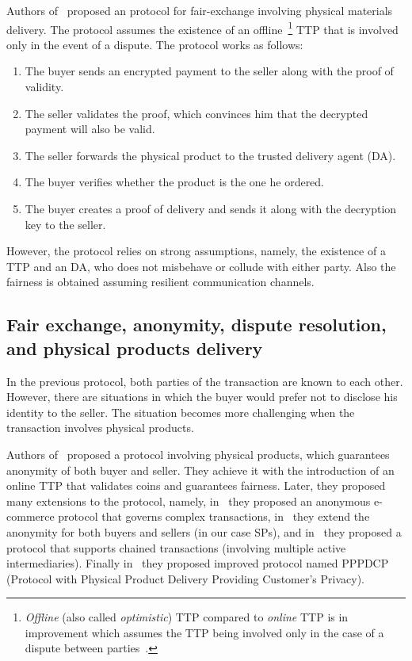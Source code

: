 \documentclass[pdftex,twocolumn,epjc3]{svjour3}
\begin{document}
Authors of~\cite{mohammedalarajFairnessPhysicalProducts2012} proposed an protocol for fair-exchange involving physical materials delivery. The protocol assumes the existence of an offline~\footnote{\textit{Offline} (also called \textit{optimistic}) TTP compared to \textit{online} TTP is in improvement which assumes the TTP being involved only in the case of a dispute between parties~\cite{rayFairExchangeEcommerce2002}.} TTP that is involved only in the event of a dispute. The protocol works as follows: 
\begin{enumerate}
\item The buyer sends an encrypted payment to the seller along with the proof of validity.
\item The seller validates the proof, which convinces him that the decrypted payment will also be valid.
\item The seller forwards the physical product to the trusted delivery agent (DA).
\item The buyer verifies whether the product is the one he ordered.
\item The buyer creates a proof of delivery and sends it along with the decryption key to the seller.
\end{enumerate}

However, the protocol relies on strong assumptions, namely, the existence of a TTP and an DA, who does not misbehave or collude with either party. Also the fairness is obtained assuming resilient communication channels.

\subsection{Fair exchange, anonymity, dispute resolution, and physical products delivery} 
\label{anonymity-and-fair-exchange-in-e-commerce-protocol-for-physical-products-delivery}

In the previous protocol, both parties of the transaction are known to each other. However, there are situations in which the buyer would prefer not to disclose his identity to the seller. The situation becomes more challenging when the transaction involves physical products.

Authors of~\cite{birjoveanuAnonymityFairexchangeEcommerce2015} proposed a protocol involving physical products, which guarantees anonymity of both buyer and seller. They achieve it with the introduction of an online TTP that validates coins and guarantees fairness. Later, they proposed many extensions to the protocol, namely, in~\cite{birjoveanuPreservingAnonymityFair2018} they proposed an anonymous e-commerce protocol that governs complex transactions, in~\cite{birjoveanuAnonymityComplexTransactions2019} they extend the anonymity for both buyers and sellers (in our case SPs), and in~\cite{birjoveanuFairExchangeECommerce2020} they proposed a protocol that supports chained transactions (involving multiple active intermediaries). Finally in~\cite{birjoveanuTwoPartyECommerceProtocols2022} they proposed improved protocol named PPPDCP (Protocol with Physical Product Delivery Providing Customer's Privacy).
\end{document}
